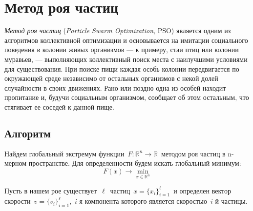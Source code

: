 

\section{Метод роя частиц}

\noindent
\emph{Метод роя частиц} (\emph{Particle Swarm Optimization}, PSO) является одним из алгоритмов коллективной оптимизации и основывается на имитации социального поведения в колонии живых организмов --- к примеру, стаи птиц или колонии муравьев, --- выполняющих коллективный поиск места с наилучшими условиями для существования. При поиске пищи каждая особь колонии передвигается по окружающей среде независимо от остальных организмов с некой долей случайности в своих движениях. Рано или поздно одна из особей находит пропитание и, будучи социальным организмом, сообщает об этом остальным, что стягивает ее соседей к данной пище.

\subsection{Алгоритм}
\noindent
Найдем глобальный экстремум функции~$F \colon \mathbb{R}^n \to \mathbb{R}$~методом роя частиц в n-мерном пространстве. Для определенности будем искать глобальный минимум:
\[
	F(x) \to \min \limits _{x \in \mathbb{R}^n}
\]

Пусть в нашем рое существует~$\ell$~частиц~$x = \{x_i\}_{i = 1}^{\ell}$~и определен вектор скорости~$v = \{v_i\}_{i=1}^{\ell}$,~$i$-я компонента которого является скоростью~$i$-й частицы.

